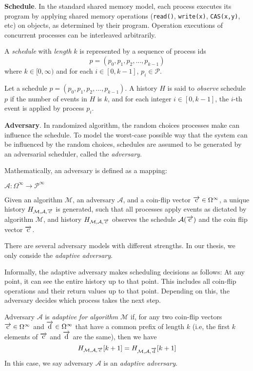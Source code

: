 \textbf{Schedule}.
In the standard shared memory model, each process executes its program by applying
shared memory operations (\texttt{read()}, \texttt{write(x)}, \texttt{CAS(x,y)}, etc) on objects,
as determined by their program. Operation executions of concurrent processes
can be interleaved arbitrarily.

A \emph{schedule} with \emph{length} $k$ is represented by a sequence of process ids
$$p = (p_0, p_1, p_2,..., p_{k-1})$$ where $k \in [0, \infty)$ and for each $i \in [0, k-1]$,
$p_i \in \mathcal{P}$.

Let a schedule $p = (p_0, p_1, p_2,..., p_{k-1})$.
A history $H$ is said to \emph{observe} schedule $p$ if the number of events in $H$ is $k$,
and for each integer $i \in [0, k-1]$, the $i$-th event is applied by process $p_i$.

\textbf{Adversary}.
In randomized algorithm, the random choices processes make can influence the schedule.
To model the worst-case possible way that the system can be influenced by the random choices,
schedules are assumed to be generated by an adversarial scheduler, called the \emph{adversary}.

Mathematically, an adversary is defined as a mapping\cite{golab2011linearizable}:
\begin{center}
$\mathcal{A} :  \Omega^{\infty} \to \mathcal{P}^{\infty}$
\end{center}

Given an algorithm $\mathcal{M}$, an adversary $\mathcal{A}$, and
a coin-flip vector $\overrightarrow{\rm c} \in \Omega^{\infty}$,
a unique history $H_{\mathcal{M},\mathcal{A}, \overrightarrow{\rm c}}$ is generated, such that all
processes apply events as dictated by algorithm $\mathcal{M}$, and history
$H_{\mathcal{M}, \mathcal{A}, \overrightarrow{\rm c}}$
observes the schedule $\mathcal{A(\overrightarrow{\rm c})}$ and the coin flip vector $\overrightarrow{\rm c}$.

There are several adversary models with different strengths\cite{DBLP:journals/corr/cs-DS-0209014}.
In our thesis, we only conside the \emph{adaptive adversary}.

Informally, the adaptive adversary makes scheduling
decisions as follows: At any point, it can see the entire history up to that point.
This includes all coin-flip operations and their return values up to that point. Depending on this,
the adversary decides which process takes the next step.

Adversary $\mathcal{A}$ is \emph{adaptive for algorithm $\mathcal{M}$}\cite{golab2011linearizable}
if, for any two coin-flip
vectors $\overrightarrow{\rm c} \in \Omega^{\infty}$ and $\overrightarrow{\rm d} \in \Omega^{\infty}$ that have a common prefix
of length $k$ (i.e, the first $k$ elements of $\overrightarrow{\rm c}$ and $\overrightarrow{\rm d}$ are the same), then we have
$$H_{\mathcal{M},\mathcal{A}, \overrightarrow{\rm c}}[k+1] = H_{\mathcal{M},\mathcal{A}, \overrightarrow{\rm d}}[k+1]$$
In this case, we say adversary $\mathcal{A}$ is an \emph{adaptive adversary}.

